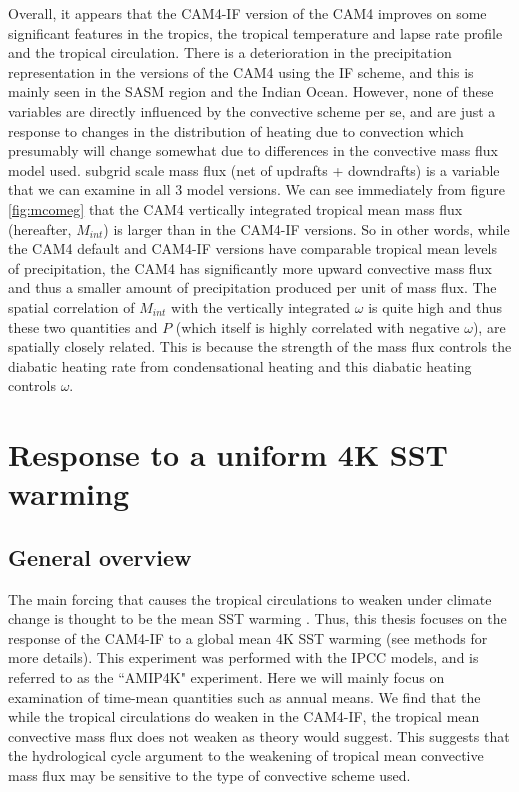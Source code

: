 \documentclass[letterpaper,12pt,titlepage,oneside,final]{book}
\begin{document}
Overall, it appears that the CAM4-IF version of the CAM4 improves on some significant features in the tropics, the tropical temperature and lapse rate profile and the tropical circulation. There is a deterioration in the precipitation representation in the versions of the CAM4 using the IF scheme, and this is mainly seen in the SASM region and the Indian Ocean. However, none of these variables are directly influenced by the convective scheme per se, and are just a response to changes in the distribution of heating due to convection which presumably will change somewhat due to differences in the convective mass flux model used. subgrid scale mass flux (net of updrafts + downdrafts) is a variable that we can examine in all 3 model versions. We can see immediately from figure \ref{fig:mcomeg} that the CAM4 vertically integrated tropical mean mass flux (hereafter, $M_{int}$) is larger than in the CAM4-IF versions.  So in other words, while the CAM4 default and CAM4-IF versions have comparable tropical mean levels of precipitation, the CAM4 has significantly more upward convective mass flux and thus a smaller amount of precipitation produced per unit of mass flux. The spatial correlation of $M_{int}$ with the vertically integrated $\omega$ is quite high and thus these two quantities and $P$ (which itself is highly correlated with negative $\omega$), are spatially closely related. This is because the strength of the mass flux controls the diabatic heating rate from condensational heating and this diabatic heating controls $\omega$. 


\section{Response to a uniform 4K SST warming}

\subsection{General overview}

The main forcing that causes the tropical circulations to weaken under climate change is thought to be the mean SST warming \citep{he_anthropogenic_2015}. Thus, this thesis focuses on the response of the CAM4-IF to a global mean 4K SST warming (see methods for more details). This experiment was performed with the IPCC models, and is referred to as the ``AMIP4K" experiment. Here we will mainly focus on examination of time-mean quantities such as annual means. We find that the while the tropical circulations do weaken in the CAM4-IF, the tropical mean convective mass flux does not weaken as theory would suggest. This suggests that the hydrological cycle argument to the weakening of tropical mean convective mass flux may be sensitive to the type of convective scheme used.
\end{document}
